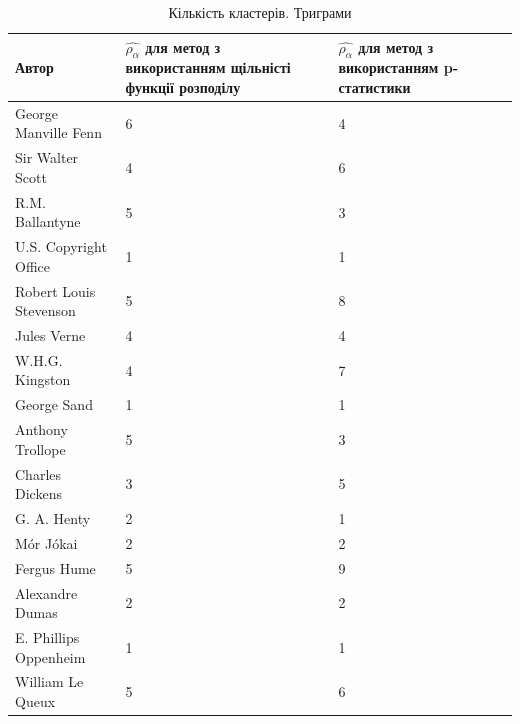 \documentclass[12pt, a4paper]{extarticle}
\begin{document}
\begin{center}
\begin{table}
\begin{tabular}{|p{11em}|p{10em}|p{10em}|}
\hline
Автор & $\hat{\rho_\alpha}$ для метод з використанням щільністі функції розподілу & $\hat{\rho_\alpha}$ для метод з використанням p-статистики\\
\hline
George Manville Fenn & 6 & 4\\
Sir Walter Scott & 4 & 6\\
R.M. Ballantyne & 5 & 3\\
U.S. Copyright Office & 1 & 1\\
Robert Louis Stevenson & 5 & 8\\
Jules Verne & 4 & 4\\
W.H.G. Kingston & 4 & 7\\
George Sand & 1 & 1\\
Anthony Trollope & 5 & 3\\
Charles Dickens & 3 & 5\\
G. A. Henty & 2 & 1\\
Mór Jókai & 2 & 2\\
Fergus Hume & 5 & 9\\
Alexandre Dumas & 2 & 2\\
E. Phillips Oppenheim & 1 & 1\\
William Le Queux & 5 & 6\\
\hline
\end{tabular}
\caption{Кількість кластерів. Триграми}
\label{tab:9}
\end{table}
\end{center}
\end{document}
